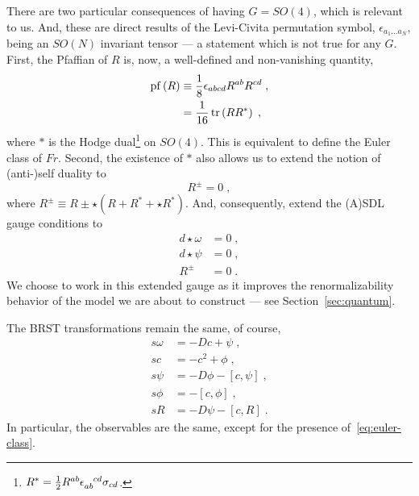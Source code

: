 \documentclass[../main.tex]{subfiles}
\begin{document}
There are two particular consequences of having $G=SO(4)$, which is relevant to us. And, these are direct results of the Levi-Civita permutation symbol, $ \epsilon_{a_1 \ldots a_N} $, being an $ SO(N) $ invariant tensor --- a statement which is not true for any $G$. First, the Pfaffian of $R$ is, now, a well-defined and non-vanishing quantity,
\begin{subequations}%
  \label{eq:euler-class}
  \begin{align}
    \operatorname{pf} \left( R \right) & \equiv \frac{ 1 }{ 8 } \epsilon_{abcd} R^{ab}R^{cd} \;, \\
                         & =\frac{ 1 }{ 16 } \operatorname{tr} \left( RR^* \right) \;,
  \end{align}
\end{subequations}
where $*$ is the Hodge dual\footnote{ $ R^* = \frac{ 1 }{ 2 } R^{ab}\tensor{ \epsilon }{_{ab}^{cd}} \sigma_{cd} $. } on $SO(4)$. This is equivalent to define the Euler class of $ Fr $. Second, the existence of $*$ also allows us to extend the notion of (anti-){}self duality to
\begin{equation}
  \label{eq:extended-self-duality}
  R^{ \pm } = 0  \;,
\end{equation}
where $ R^{ \pm } \equiv R \pm \star \left( R + R^{ * } + \star R^{ * } \right) $. And, consequently, extend the (A){}SDL gauge conditions to
\begin{subequations}%
  \label{eq:extended-asdlg}
  \begin{align}
    d \star \omega & = 0 \;, \\
    d \star \psi   & = 0 \;, \\
    R^{ \pm }      & =0 \;.
  \end{align}
\end{subequations}
We choose to work in this extended gauge as it improves the renormalizability behavior of the model we are about to construct --- see Section~\ref{sec:quantum}.

The BRST transformations remain the same, of course,
\begin{subequations}%
  \label{eq:top_grav_brst}
  \begin{align}
    s\omega & = -Dc + \psi \;,                      \\
    sc      & = - c^2 + \phi \;,                    \\
    s\psi   & = -D\phi - \left[ c, \psi \right] \;, \\
    s\phi   & = - \left[ c, \phi \right]\;,         \\
    sR      & = -D\psi - \left[ c, R \right] \;.
  \end{align}
\end{subequations}
In particular, the observables are the same, except for the presence of~\eqref{eq:euler-class}.
\end{document}
